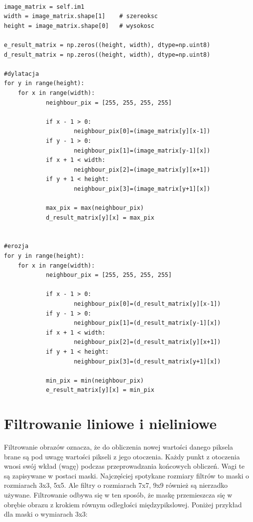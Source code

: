 \documentclass[final,a4paper,openany,12pt]{mwbk}
\begin{document}
\begin{lstlisting}[caption= Operacja zamknięcia na obrazie szarym]

image_matrix = self.im1
width = image_matrix.shape[1]    # szereoksc
height = image_matrix.shape[0]   # wysokosc

e_result_matrix = np.zeros((height, width), dtype=np.uint8)
d_result_matrix = np.zeros((height, width), dtype=np.uint8)

#dylatacja
for y in range(height):
    for x in range(width):  
            neighbour_pix = [255, 255, 255, 255]

            if x - 1 > 0:
                    neighbour_pix[0]=(image_matrix[y][x-1])
            if y - 1 > 0:
                    neighbour_pix[1]=(image_matrix[y-1][x])
            if x + 1 < width:
                    neighbour_pix[2]=(image_matrix[y][x+1])
            if y + 1 < height:
                    neighbour_pix[3]=(image_matrix[y+1][x])

            max_pix = max(neighbour_pix)
            d_result_matrix[y][x] = max_pix   


#erozja
for y in range(height):
    for x in range(width):  
            neighbour_pix = [255, 255, 255, 255]

            if x - 1 > 0:
                    neighbour_pix[0]=(d_result_matrix[y][x-1])
            if y - 1 > 0:
                    neighbour_pix[1]=(d_result_matrix[y-1][x])
            if x + 1 < width:
                    neighbour_pix[2]=(d_result_matrix[y][x+1])
            if y + 1 < height:
                    neighbour_pix[3]=(d_result_matrix[y+1][x])

            min_pix = min(neighbour_pix)
            e_result_matrix[y][x] = min_pix     

\end{lstlisting}
\newpage


\chapter {Filtrowanie liniowe i nieliniowe}
Filtrowanie obrazów oznacza, że do obliczenia nowej wartości danego piksela brane są pod uwagę wartości pikseli z jego otoczenia. Każdy punkt z otoczenia wnosi swój wkład (wagę) podczas przeprowadzania końcowych obliczeń. Wagi te są zapisywane w postaci maski. Najczęściej spotykane rozmiary filtrów to maski o rozmiarach 3x3, 5x5. Ale filtry o rozmiarach 7x7, 9x9 również są nierzadko używane. Filtrowanie odbywa się w ten sposób, że maskę przemieszcza się w obrębie obrazu z krokiem równym odległości międzypikslowej. Poniżej przykład dla maski o wymiarach 3x3:
\end{document}
